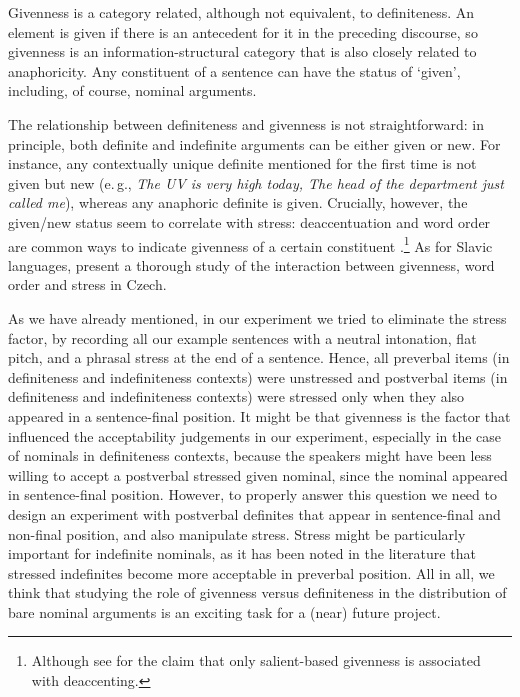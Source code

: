 \documentclass[output=paper]{langsci/langscibook}
\begin{document}
Givenness is a category related, although not equivalent, to definiteness. An element is given if there is an antecedent for it in the preceding discourse, so givenness is an information-structural category that is also closely related to anaphoricity. Any constituent of a sentence can have the status of `given', including, of course, nominal arguments.

The relationship between definiteness and givenness is not straightforward: in principle, both definite and indefinite arguments can be either given or new. For instance, any contextually unique definite mentioned for the first time is not given but new (e.\,g., {\emph{The UV is very high today, The head of the department just called me}}), whereas any anaphoric definite is given. Crucially, however, the given/new status seem to correlate with stress: deaccentuation and word order are common ways to indicate givenness of a certain constituent \citep[cf.][]{krifka:08}.\footnote{Although see \cite{rochemont:16} for the claim that only salient-based givenness is associated with deaccenting.}  As for Slavic languages, \cite{simik:wierzba:15} present a thorough study of the interaction between givenness, word order and stress in Czech.

{
As we have already mentioned, in our experiment we tried to eliminate the stress factor, by recording all our example sentences with a neutral intonation, flat pitch, and a phrasal stress at the end of a sentence. Hence, all preverbal items (in definiteness and indefiniteness contexts) were unstressed and postverbal items (in definiteness and indefiniteness contexts) were stressed only when they also appeared in a sentence-final position. It might be that givenness is the factor that influenced the acceptability judgements in our experiment, especially in the case of nominals in definiteness contexts, because the speakers might have been less willing to accept a postverbal stressed given nominal, since the nominal appeared in sentence-final position. However, to properly answer this question we need to design an experiment with postverbal definites that appear in sentence-final and non-final position, and also manipulate stress. Stress might be particularly important for indefinite nominals, as it has been noted in the literature that stressed indefinites become more acceptable in preverbal position. All in all, we think that studying the role of givenness versus definiteness in the distribution of bare nominal arguments is an exciting task for a (near) future project.
}
\end{document}
